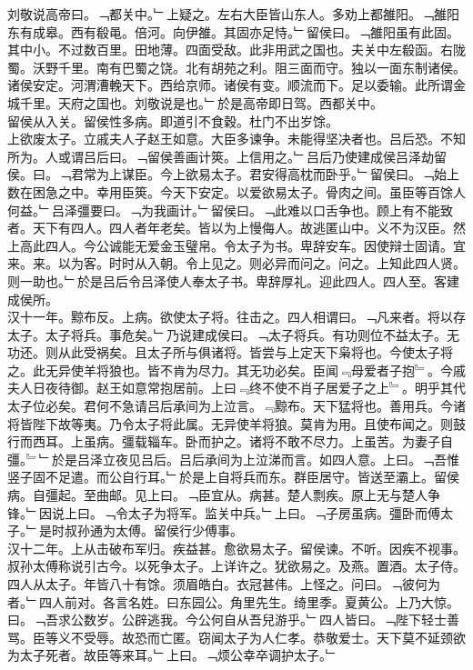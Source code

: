 \documentclass{zhvt-classic}
\begin{document}
\hspace*{2em}刘敬说高帝曰。﹁都关中。﹂上疑之。左右大臣皆山东人。多劝上都雒阳。﹁雒阳东有成皋。西有殽黾。倍河。向伊雒。其固亦足恃。﹂留侯曰。﹁雒阳虽有此固。其中小。不过数百里。田地薄。四面受敌。此非用武之国也。夫关中左殽函。右陇蜀。沃野千里。南有巴蜀之饶。北有胡苑之利。阻三面而守。独以一面东制诸侯。诸侯安定。河渭漕輓天下。西给京师。诸侯有变。顺流而下。足以委输。此所谓金城千里。天府之国也。刘敬说是也。﹂於是高帝即日驾。西都关中。\\
\hspace*{2em}留侯从入关。留侯性多病。即道引不食穀。杜门不出岁馀。\\
\hspace*{2em}上欲废太子。立戚夫人子赵王如意。大臣多谏争。未能得坚决者也。吕后恐。不知所为。人或谓吕后曰。﹁留侯善画计筴。上信用之。﹂吕后乃使建成侯吕泽劫留侯。曰。﹁君常为上谋臣。今上欲易太子。君安得高枕而卧乎。﹂留侯曰。﹁始上数在困急之中。幸用臣筴。今天下安定。以爱欲易太子。骨肉之间。虽臣等百馀人何益。﹂吕泽彊要曰。﹁为我画计。﹂留侯曰。﹁此难以口舌争也。顾上有不能致者。天下有四人。四人者年老矣。皆以为上慢侮人。故逃匿山中。义不为汉臣。然上高此四人。今公诚能无爱金玉璧帛。令太子为书。卑辞安车。因使辩士固请。宜来。来。以为客。时时从入朝。令上见之。则必异而问之。问之。上知此四人贤。则一助也。﹂於是吕后令吕泽使人奉太子书。卑辞厚礼。迎此四人。四人至。客建成侯所。\\
\hspace*{2em}汉十一年。黥布反。上病。欲使太子将。往击之。四人相谓曰。﹁凡来者。将以存太子。太子将兵。事危矣。﹂乃说建成侯曰。﹁太子将兵。有功则位不益太子。无功还。则从此受祸矣。且太子所与俱诸将。皆尝与上定天下枭将也。今使太子将之。此无异使羊将狼也。皆不肯为尽力。其无功必矣。臣闻﹃母爱者子抱﹄。今戚夫人日夜待御。赵王如意常抱居前。上曰﹃终不使不肖子居爱子之上﹄。明乎其代太子位必矣。君何不急请吕后承间为上泣言。﹃黥布。天下猛将也。善用兵。今诸将皆陛下故等夷。乃令太子将此属。无异使羊将狼。莫肯为用。且使布闻之。则鼓行而西耳。上虽病。彊载辎车。卧而护之。诸将不敢不尽力。上虽苦。为妻子自彊。﹄﹂於是吕泽立夜见吕后。吕后承间为上泣涕而言。如四人意。上曰。﹁吾惟竖子固不足遣。而公自行耳。﹂於是上自将兵而东。群臣居守。皆送至灞上。留侯病。自彊起。至曲邮。见上曰。﹁臣宜从。病甚。楚人剽疾。原上无与楚人争锋。﹂因说上曰。﹁令太子为将军。监关中兵。﹂上曰。﹁子房虽病。彊卧而傅太子。﹂是时叔孙通为太傅。留侯行少傅事。\\
\hspace*{2em}汉十二年。上从击破布军归。疾益甚。愈欲易太子。留侯谏。不听。因疾不视事。叔孙太傅称说引古今。以死争太子。上详许之。犹欲易之。及燕。置酒。太子侍。四人从太子。年皆八十有馀。须眉皓白。衣冠甚伟。上怪之。问曰。﹁彼何为者。﹂四人前对。各言名姓。曰东园公。角里先生。绮里季。夏黄公。上乃大惊。曰。﹁吾求公数岁。公辟逃我。今公何自从吾兒游乎。﹂四人皆曰。﹁陛下轻士善骂。臣等义不受辱。故恐而亡匿。窃闻太子为人仁孝。恭敬爱士。天下莫不延颈欲为太子死者。故臣等来耳。﹂上曰。﹁烦公幸卒调护太子。﹂\\
\end{document}
